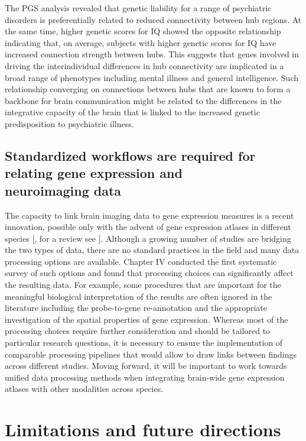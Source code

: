 The PGS analysis revealed that genetic liability for a range of psychiatric disorders is preferentially related to reduced connectivity between hub regions. At the same time, higher genetic scores for IQ showed the opposite relationship indicating that, on average, subjects with higher genetic scores for IQ have increased connection strength between hubs. This suggests that genes involved in driving the interindividual differences in hub connectivity are implicated in a broad range of phenotypes including mental illness and general intelligence. Such relationship converging on connections between hubs that are known to form a backbone for brain communication \citep{Harriger2012, VandenHeuvel2011,VandenHeuvel2013b} might be related to the differences in the integrative capacity of the brain that is linked to the increased genetic predisposition to psychiatric illness.

\subsection*{Standardized workflows are required for relating gene expression and \\neuroimaging data}

The capacity to link brain imaging data to gene expression measures is a recent innovation, possible only with the advent of gene expression atlases in different species [\citep{Harris2010,Hawrylycz2012,Lein2007a}, for a review see \citep{Keil2018}]. Although a growing number of studies are bridging the two types of data, there are no standard practices in the field and many data processing options are available. Chapter IV conducted the first systematic survey of such options and found that processing choices can significantly affect the resulting data. For example, some procedures that are important for the meaningful biological interpretation of the results are often ignored in the literature including the probe-to-gene re-annotation and the appropriate investigation of the spatial properties of gene expression. Whereas most of the processing choices require further consideration and should be tailored to particular research questions, it is necessary to ensure the implementation of comparable processing pipelines that would allow to draw links between findings across different studies. Moving forward, it will be important to work towards unified data processing methods when integrating brain-wide gene expression atlases with other modalities across species.

\section{Limitations and future directions}

